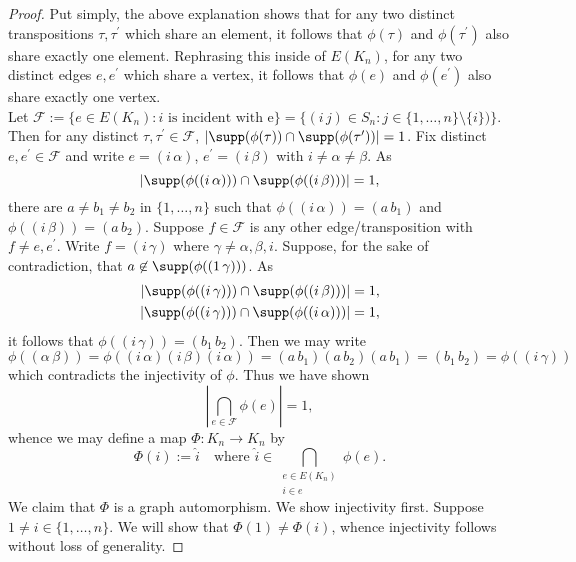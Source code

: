\documentclass[12pt]{article}
\begin{document}
\begin{homeworkProblem}
\begin{proof}
    Put simply, the above explanation shows that for any two distinct transpositions $ \tau, \tau^{\prime} $ which share an element, it follows that $ \phi(\tau) $ and $ \phi(\tau^{\prime}) $ also share exactly one element. Rephrasing this inside of $ E(K_{n}) $, for any two distinct edges $ e,e^{\prime} $ which share a vertex, it follows that $ \phi(e) $ and $ \phi(e^{\prime}) $ also share exactly one vertex.\\


%
%
    Let $ \mathcal{F}:= \{e\in E(K_{n}): i \text{ is incident with e}\} = \{(i\,j)\in S_{n}: j\in\{1,\ldots, n\}\setminus\{i\})\} $. Then for any distinct $ \tau,\tau^{\prime}\in \mathcal{F} $, $ |\supp(\phi(\tau))\cap \supp(\phi(\tau^{\prime}))| = 1 $. Fix distinct $ e,e^{\prime}\in \mathcal{F} $ and write $ e = (i\,\alpha) $, $ e^{\prime} = (i\, \beta) $ with $i\neq \alpha\neq \beta $. As 
    \[
      |\supp(\phi((i\,\alpha))) \cap \supp(\phi((i\,\beta)))| = 1,
    \]
    there are $ a\neq b_{1}\neq b_{2} $ in $ \{1,\ldots, n\} $ such that $ \phi((i\,\alpha)) = (a\, b_{1}) $ and $ \phi((i\,\beta)) = (a\, b_{2}) $. Suppose $ f\in \mathcal{F} $ is any other edge/transposition with $ f\neq e,e^{\prime} $. Write $ f = (i\,\gamma) $ where $ \gamma\neq \alpha, \beta, i $. Suppose, for the sake of contradiction, that $ a\not\in \supp(\phi((1\,\gamma))) $.
    As 
    \begin{align*}
      |\supp(\phi((i\,\gamma))) \cap \supp(\phi((i\,\beta)))| &= 1,\\
      |\supp(\phi((i\, \gamma))) \cap \supp(\phi((i\,\alpha)))| &= 1,
    \end{align*}
    it follows that $ \phi((i\,\gamma)) = (b_{1}\,b_{2}) $. Then we may write
    \[
      \phi((\alpha\,\beta)) = \phi((i\,\alpha)(i\,\beta)(i\,\alpha)) = (a\,b_{1})(a\,b_{2})(a\,b_{1}) = (b_{1}\, b_{2}) = \phi((i\,\gamma))
    \]
    which contradicts the injectivity of $ \phi $. Thus we have shown
    \[
      \left|\bigcap_{e\in \mathcal{F}} \phi(e)\right| = 1,
    \]
    whence we may define a map $ \Phi: K_{n} \to K_{n} $ by 
    \[
      \Phi(i):= \widehat{i} \quad \text{where }\widehat{i}\in\bigcap_{\substack{e\in E(K_{n})\\i\in e}} \phi(e).
    \]
    We claim that $ \Phi $ is a graph automorphism. We show injectivity first. Suppose $ 1\neq i\in \{1,\ldots, n\} $. We will show that $ \Phi(1)\neq \Phi(i) $, whence injectivity follows without loss of generality.


\end{proof}
\end{homeworkProblem}
\end{document}

